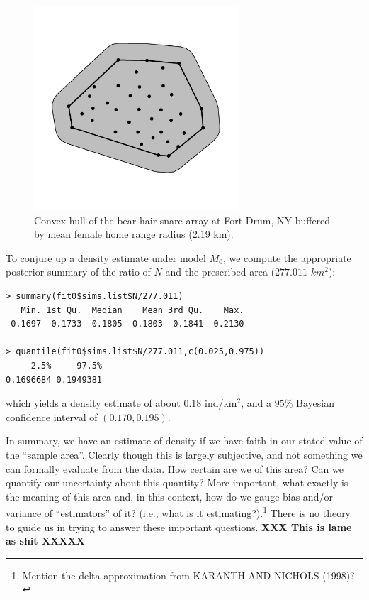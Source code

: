 \begin{figure}
\begin{center}
\includegraphics[height=3in,width=3in]{Ch3-Closed/figs/bufferedCH}
\end{center}
\caption{Convex hull of the bear hair snare array at Fort Drum, NY buffered by mean female
home range radius (2.19 km).}
\label{closed.fig.bch}
\end{figure}

To conjure up a
density estimate under model $M_0$, we compute the appropriate
posterior summary of the ratio of $N$ and the prescribed area ($277.011$ $km^2$):
{\small
\begin{verbatim}
> summary(fit0$sims.list$N/277.011)
   Min. 1st Qu.  Median    Mean 3rd Qu.    Max.
 0.1697  0.1733  0.1805  0.1803  0.1841  0.2130

> quantile(fit0$sims.list$N/277.011,c(0.025,0.975))
     2.5%     97.5%
0.1696684 0.1949381
\end{verbatim}
}
which yields a density estimate of about $0.18$ ind/km$^2$, and a $95\%$ Bayesian
confidence interval of $(0.170, 0.195)$.

In summary, we have an estimate of density if we have faith in our
stated value of the ``sample area''. Clearly though this is largely
subjective, and not something we can formally evaluate from the data.
How certain are we of this area? Can
we quantify our uncertainty about this quantity?
 More important, what exactly is
the meaning of this area and, in this context, how do we gauge bias
and/or variance of ``estimators'' of it? (i.e., what is it
estimating?).\footnote{Mention the delta approximation from
KARANTH AND NICHOLS (1998)?}
There is no theory to guide us in trying to answer these important questions.
{\bf XXX This is lame as shit XXXXX}

